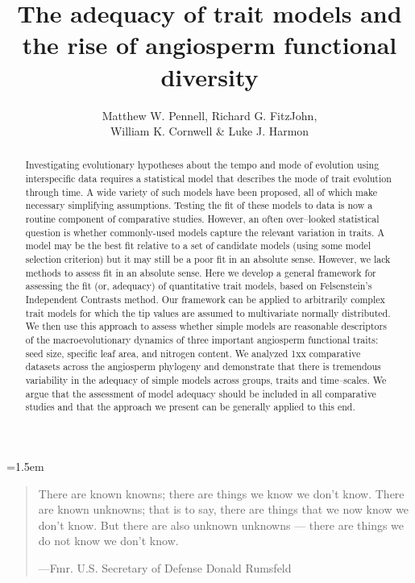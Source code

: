 \documentclass[12pt]{article}
\title{The adequacy of trait models and the rise of angiosperm functional diversity}
\author{
Matthew W. Pennell, Richard G. FitzJohn,\\
William K. Cornwell \& Luke J. Harmon
}
\date{}
\begin{document}
\maketitle
\parindent=1.5em
\addtolength{\parskip}{.3em}
\vfill


\begin{abstract}
Investigating evolutionary hypotheses about the tempo and mode of evolution using interspecific data requires a statistical model that describes the mode of trait evolution through time. A wide variety of such models have been proposed, all of which make necessary simplifying assumptions.  Testing the fit of these models to data is now a routine component of comparative studies. However, an often over--looked statistical question is whether commonly-used models capture the relevant variation in traits. A model may be the best fit  relative to a set of candidate models (using some model selection criterion) but it may still be a poor fit in an absolute sense. However, we lack methods to assess fit in an absolute sense.  Here we develop a general framework for assessing the fit (or, adequacy) of quantitative trait models, based on Felsenstein's Independent Contrasts method. Our framework can be applied to arbitrarily complex trait models for which the tip values are assumed to multivariate normally distributed. We then use this approach to assess whether simple models are reasonable descriptors of the macroevolutionary dynamics of three important angiosperm functional traits: seed size, specific leaf area, and nitrogen content. We analyzed 1xx comparative datasets across the angiosperm phylogeny and demonstrate that there is tremendous variability in the adequacy of simple models across groups, traits and time--scales. We argue that the assessment of model adequacy should be included in all comparative studies and that the approach we present can be generally applied to this end.
\end{abstract}

\vfill

\newpage


\begin{quotation}
\noindent There are known knowns; there are things we know we don't know. There are known unknowns; that is to say, there are things that we now know we don't know. But there are also unknown unknowns --- there are things we do not know we don't know.

---Fmr. U.S. Secretary of Defense Donald Rumsfeld
\end{quotation}
\end{document}
